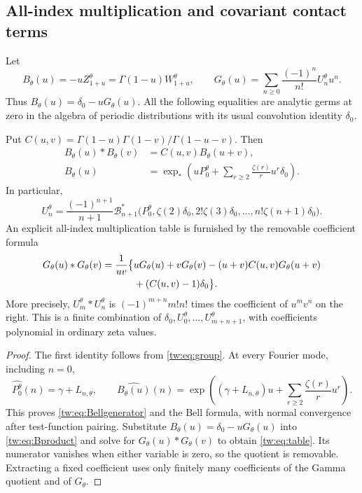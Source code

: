 \subsection{All-index multiplication and covariant contact terms}

Let
\begin{equation}\label{tw:eq:B}
 B_\theta(u)=-uZ_{1+u}^\theta
      =\Gamma(1-u)W_{1+u}^\theta,
 \qquad
 G_\theta(u)=\sum_{n\ge0}\frac{(-1)^n}{n!}U_n^\theta u^n.
\end{equation}
Thus $B_\theta(u)=\delta_0-uG_\theta(u)$. All the following
equalities are analytic germs at zero in the algebra of periodic
distributions with its usual convolution identity $\delta_0$.

\begin{theorem}
\label{tw:thm:normalform}
Put $C(u,v)=\Gamma(1-u)\Gamma(1-v)/\Gamma(1-u-v)$. Then
\begin{align}
 B_\theta(u)*B_\theta(v)&=C(u,v)B_\theta(u+v),
 \label{tw:eq:Bproduct}\\
 B_\theta(u)&=\exp_*\left(uP_0^\theta+
                \sum_{r\ge2}\frac{\zeta(r)}r u^r\delta_0\right).
 \label{tw:eq:Bellgenerator}
\end{align}
In particular,
\begin{equation}\label{tw:eq:Bell}
 U_n^\theta=\frac{(-1)^{n+1}}{n+1}
 \mathcal B_{n+1}^*
 \bigl(P_0^\theta,\zeta(2)\delta_0,2!\zeta(3)\delta_0,
                            \ldots,n!\zeta(n+1)\delta_0\bigr).
\end{equation}
An explicit all-index multiplication table is furnished by the
removable coefficient formula
\begin{align}
 G_\theta(u)*G_\theta(v)
 =\frac{1}{uv}\bigl\{&uG_\theta(u)+vG_\theta(v)
       -(u+v)C(u,v)G_\theta(u+v)\notag\\
       &+(C(u,v)-1)\delta_0\bigr\}.
 \label{tw:eq:table}
\end{align}
More precisely, $U_m^\theta*U_n^\theta$ is $(-1)^{m+n}m!n!$
times the coefficient of $u^mv^n$ on the right. This is a finite
combination of $\delta_0,U_0^\theta,\ldots,U_{m+n+1}^\theta$,
with coefficients polynomial in ordinary zeta values.
\end{theorem}

\begin{proof}
The first identity follows from \eqref{tw:eq:group}. At every
Fourier mode, including $n=0$,
\[
 \widehat{P_0^\theta}(n)=\gamma+L_{n,\theta},\qquad
 \widehat{B_\theta(u)}(n)
       =\exp\left((\gamma+L_{n,\theta})u+
                         \sum_{r\ge2}\frac{\zeta(r)}r u^r\right).
\]
This proves \eqref{tw:eq:Bellgenerator} and the Bell formula, with
normal convergence after test-function pairing. Substitute
$B_\theta(u)=\delta_0-uG_\theta(u)$ into
\eqref{tw:eq:Bproduct} and solve for
$G_\theta(u)*G_\theta(v)$ to obtain \eqref{tw:eq:table}. Its
numerator vanishes when either variable is zero, so the quotient
is removable. Extracting a fixed coefficient uses only finitely
many coefficients of the Gamma quotient and of $G_\theta$.
\end{proof}


